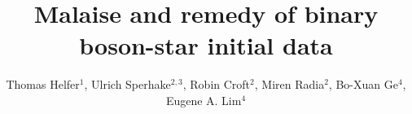 \documentclass[]{iopart}
\begin{document}

\pagestyle{fancy}
\chead{}
\rhead{\thepage}
\lfoot{}
\cfoot{}
\rfoot{}

\begin{center}
\title{\large Malaise and remedy of binary boson-star initial data}
\end{center}

\author{
Thomas Helfer$^{1}$,
Ulrich Sperhake$^{2,3}$,
Robin Croft$^{2}$,
Miren Radia$^{2}$,
Bo-Xuan Ge$^4$,
Eugene A. Lim$^4$
}

\address{$^{1}$~Department of Physics and Astronomy, Johns Hopkins University, 3400 N. Charles Street, Baltimore, Maryland 21218, USA}

\address{$^{2}$~Department of Applied Mathematics and Theoretical Physics,
Centre for Mathematical Sciences, University of Cambridge,
Wilberforce Road, Cambridge CB3 0WA, United Kingdom}

\address{$^{3}$~Theoretical Astrophysics 350-17,
California Institute of Technology,
1200 E California Boulevard, Pasadena, CA 91125, USA}


\address{$^{4}$~Theoretical Particle Physics and Cosmology Group, Physics Department,Kings College London, Strand, London WC2R 2LS, United Kingdom}



\end{document}
